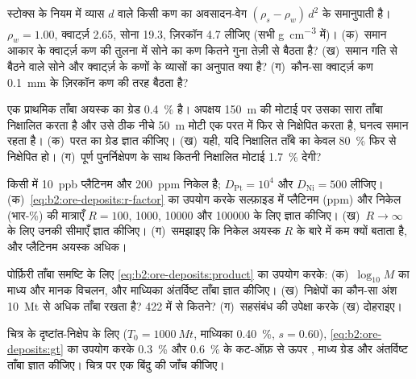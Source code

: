\begin{exercise}[$\star$]\label{exo:b2:ore-deposits:3}
स्टोक्स के नियम में व्यास $d$ वाले किसी कण का अवसादन-वेग $(\rho_s -
\rho_w)\,d^2$ के समानुपाती है। $\rho_w = 1.00$, क्वार्ट्ज़ 2.65, सोना 19.3, ज़िरकॉन 4.7 लीजिए (सभी
\unit{g.cm^{-3}} में)। (क)~समान आकार के क्वार्ट्ज़ कण की तुलना में सोने का कण कितने गुना तेज़ी से बैठता है?
(ख)~समान गति से बैठने वाले सोने और क्वार्ट्ज़ के कणों के व्यासों का अनुपात क्या है? (ग)~कौन-सा
क्वार्ट्ज़ कण \qty{0.1}{mm} के ज़िरकॉन कण की तरह बैठता है?
\end{exercise}

\begin{exercise}[$\star$]\label{exo:b2:ore-deposits:4}
एक प्राथमिक ताँबा अयस्क का ग्रेड \qty{0.4}{\percent} है। अपक्षय \qty{150}{m} की मोटाई पर उसका सारा
ताँबा निक्षालित करता है और उसे ठीक नीचे \qty{50}{m} मोटी एक परत में फिर से निक्षेपित करता है, घनत्व
समान रहता है। (क)~परत का ग्रेड ज्ञात कीजिए। (ख)~यही, यदि निक्षालित ताँबे का केवल \qty{80}{\percent}
फिर से निक्षेपित हो। (ग)~पूर्ण पुनर्निक्षेपण के साथ कितनी निक्षालित मोटाई \qty{1.7}{\percent}
देगी?
\end{exercise}

\begin{exercise}[$\star\star$]\label{exo:b2:ore-deposits:5}
किसी  में \qty{10}{ppb} प्लैटिनम और \qty{200}{ppm} निकेल है; $D_{\mathrm{Pt}} =
10^4$ और $D_{\mathrm{Ni}} = 500$ लीजिए। (क)~\eqref{eq:b2:ore-deposits:r-factor} का उपयोग करके
सल्फ़ाइड में प्लैटिनम (ppm) और निकेल (भार-\%) की मात्राएँ $R = 100$, \num{1000}, \num{10000}
और \num{100000} के लिए ज्ञात कीजिए। (ख)~$R \to \infty$ के लिए उनकी सीमाएँ ज्ञात कीजिए। (ग)~समझाइए कि
निकेल अयस्क $R$ के बारे में कम क्यों बताता है, और प्लैटिनम अयस्क अधिक।
\end{exercise}

\begin{exercise}[$\star\star$]\label{exo:b2:ore-deposits:6}
पोर्फ़िरी ताँबा समष्टि के लिए \eqref{eq:b2:ore-deposits:product} का उपयोग करके: (क)~$\log_{10} M$ का माध्य
और मानक विचलन, और माध्यिका अंतर्विष्ट ताँबा ज्ञात कीजिए। (ख)~निक्षेपों का कौन-सा अंश \qty{10}{Mt} से अधिक
ताँबा रखता है? 422 में से कितने? (ग)~सहसंबंध की उपेक्षा करके (ख) दोहराइए।
\end{exercise}

\begin{exercise}[$\star\star$]\label{exo:b2:ore-deposits:7}
चित्र के दृष्टांत-निक्षेप के लिए ($T_0 = \qty{1000}{Mt}$, माध्यिका \qty{0.40}{\percent},
$s = 0.60$), \eqref{eq:b2:ore-deposits:gt} का उपयोग करके \qty{0.3}{\percent} और \qty{0.6}{\percent} के
कट-ऑफ़ से ऊपर , माध्य ग्रेड और अंतर्विष्ट ताँबा ज्ञात कीजिए। चित्र पर एक बिंदु की जाँच कीजिए।
\end{exercise}

